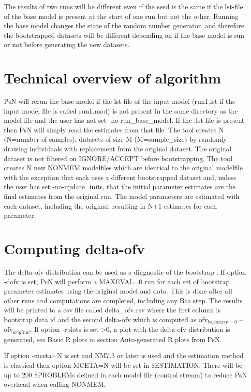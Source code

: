 The results of two runs will be different even if the seed is the same if the lst-file of the base model is present at the start of one run but not the other. Running the base model changes the state of the random number generator, and therefore the bootstrapped datasets will be different depending on if the base model is run or not before generating the  new datasets. 

\section{Technical overview of algorithm}

PsN will rerun the base model if the lst-file of the input model (run1.lst if the input model file is called run1.mod) is not present in the same directory as the model file 
and the user has not set -no-run\_base\_model. If the .lst-file is present then PsN will simply read the estimates from that file.
The tool creates N (N=number of samples), datasets of size M (M=sample\_size) by randomly drawing individuals with replacement from the original dataset. The original dataset is not filtered on IGNORE/ACCEPT before bootstrapping. The tool creates N new NONMEM modelfiles which are identical to the original modelfile with the exception that each uses a different  bootstrapped dataset and, unless the user has set -no-update\_inits, that the initial parameter estimates are the final estimates from the original run. 
The model parameters are estimated with each dataset, including the original, resulting in N+1 estimates for each parameter.

\section{Computing delta-ofv}

The delta-ofv distribution can be used as a 
diagnostic of the bootstrap \cite{Niebecker}.
If option -dofv is set, PsN will perform a MAXEVAL=0 run for each set of bootstrap parameter estimates using the original model and data. This is done after all other runs and computations are completed, including any Bca step. The results will be printed to a csv file called delta\_ofv.csv where the first column is bootstrap data id and the second delta-ofv which is computed as 
$\mathrm{ofv}_{bs,maxev=0}$ – $\mathrm{ofv}_{original}$. 
If option -rplots is set >0, a plot with the delta-ofv distribution is
generated, see Basic R plots in section Auto-generated R plots from PsN. 

If option -mceta=N is set and NM7.3 or later is used and the estimation method is classical then option MCETA=N will be set in \$ESTIMATION. There will be up to 200 \$PROBLEMs defined in each model file (control stream) to reduce PsN overhead when calling NONMEM.

